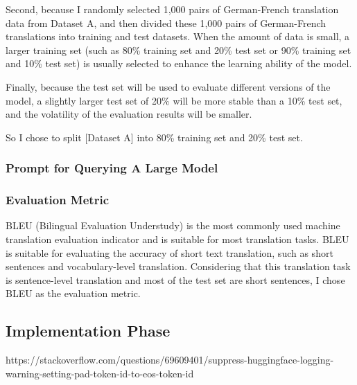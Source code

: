 Second, because I randomly selected 1,000 pairs of German-French translation data from Dataset A, 
and then divided these 1,000 pairs of German-French translations into training and test datasets. 
When the amount of data is small, a larger training set 
(such as 80\% training set and 20\% test set or 90\% training set and 10\% test set) 
is usually selected to enhance the learning ability of the model.

Finally, because the test set will be used to evaluate different versions of the model, 
a slightly larger test set of 20\% will be more stable than a 10\% test set, 
and the volatility of the evaluation results will be smaller.

So I chose to split [Dataset A] into 80\% training set and 20\% test set.

\subsubsection{Prompt for Querying A Large Model}

\subsubsection{Evaluation Metric}
BLEU (Bilingual Evaluation Understudy)\cite{10.3115/1073083.1073135} is the most commonly used 
machine translation evaluation indicator and is suitable for most translation tasks. 
BLEU is suitable for evaluating the accuracy of short text translation, 
such as short sentences and vocabulary-level translation. 
Considering that this translation task is sentence-level translation and 
most of the test set are short sentences, I chose BLEU as the evaluation metric.

\subsection{Implementation Phase}
\label{subsec:implementation}

https://stackoverflow.com/questions/69609401/suppress-huggingface-logging-warning-setting-pad-token-id-to-eos-token-id